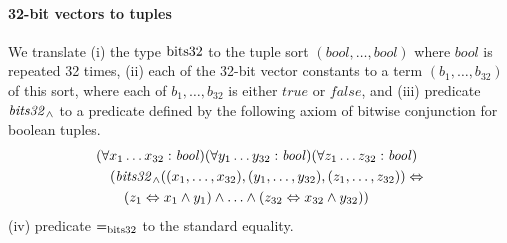 \paragraph{32-bit vectors to tuples}
We translate
(i) the type $\mathrm{bits32}$ to the tuple sort $(\mathit{bool},\ldots,\mathit{bool})$ where $\mathit{bool}$ is repeated 32 times,
(ii) each of the 32-bit vector constants to a term $(b_1,\ldots,b_{32})$ of this sort, where each of $b_1,\ldots,b_{32}$ is either $\mathit{true}$ or $\mathit{false}$, and
(iii) predicate $\mathit{bits32}_\wedge$ to a predicate defined by the following axiom of bitwise conjunction for boolean tuples.
\begin{equation*}
\begin{aligned}
&(\forall x_1\ldots x_{32}:\mathit{bool})(\forall y_1\ldots y_{32}:\mathit{bool})(\forall z_1\ldots z_{32}:\mathit{bool})\\
&\quad(\mathit{bits32}_\wedge((x_1,\ldots,x_{32}),(y_1,\ldots,y_{32}),(z_1,\ldots,z_{32}))\Leftrightarrow\\
&\quad\quad (z_1\Leftrightarrow x_1\wedge y_1)\wedge\ldots\wedge(z_{32}\Leftrightarrow x_{32}\wedge y_{32}))
\end{aligned}
\end{equation*}
(iv) predicate $\mathit{=}_{\mathrm{bits32}}$ to the standard equality.

